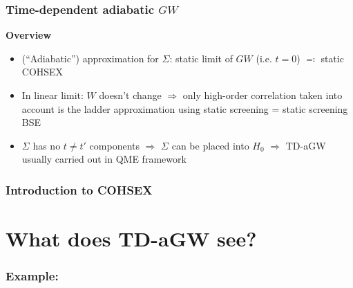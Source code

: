 \documentclass[t]{beamer}
\begin{document}
\begin{frame}
\frametitle{Time-dependent adiabatic $GW$}

\textbf{Overview} \begin{itemize}
    \item (``Adiabatic'') approximation for $\Sigma$: static limit of $GW$ (i.e. $t = 0$) $\eqqcolon$ static COHSEX
    \item In linear limit: $W$ doesn't change $\Rightarrow$ 
        only high-order correlation taken into account is the ladder approximation using 
        static screening = static screening BSE
    \item $\Sigma$ has no $t \neq t'$ components $\Rightarrow$
        $\Sigma$ can be placed into $H_0$
        $\Rightarrow$ TD-aGW usually carried out in QME framework
\end{itemize}    

\end{frame}

\begin{frame}
\frametitle{Introduction to COHSEX}

    

\end{frame}

\section{What does TD-aGW see?}

\begin{frame}
    \frametitle{Example: }

    

\end{frame}
\end{document}
